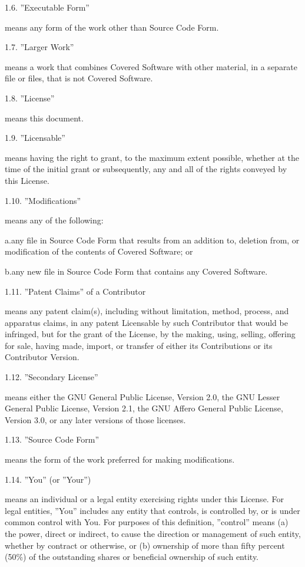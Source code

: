 1.6. ''Executable Form''

means any form of the work other than Source Code Form.

1.7. ''Larger Work''

means a work that combines Covered Software with other material, in a separate file or files, that is not Covered Software.

1.8. ''License''

means this document.

1.9. ''Licensable''

means having the right to grant, to the maximum extent possible, whether at the time of the initial grant or subsequently, any and all of the rights conveyed by this License.

1.10. ''Modifications''

means any of the following:

a.any file in Source Code Form that results from an addition to, deletion from, or modification of the contents of Covered Software; or

b.any new file in Source Code Form that contains any Covered Software.

1.11. ''Patent Claims'' of a Contributor

means any patent claim(s), including without limitation, method, process, and apparatus claims, in any patent Licensable by such Contributor that would be infringed, but for the grant of the License, by the making, using, selling, offering for sale, having made, import, or transfer of either its Contributions or its Contributor Version.

1.12. ''Secondary License''

means either the GNU General Public License, Version 2.0, the GNU Lesser General Public License, Version 2.1, the GNU Affero General Public License, Version 3.0, or any later versions of those licenses.

1.13. ''Source Code Form''

means the form of the work preferred for making modifications.

1.14. ''You'' (or ''Your'')

means an individual or a legal entity exercising rights under this License. For legal entities, ''You'' includes any entity that controls, is controlled by, or is under common control with You. For purposes of this definition, ''control'' means (a) the power, direct or indirect, to cause the direction or management of such entity, whether by contract or otherwise, or (b) ownership of more than fifty percent (50\%) of the outstanding shares or beneficial ownership of such entity.

